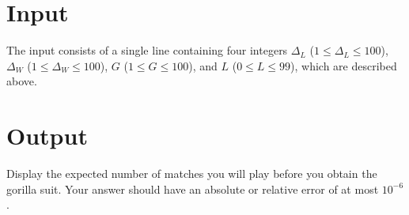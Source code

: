 
\section*{Input}
The input consists of a single line containing four integers $\Delta_L$ ($1 \leq \Delta_L \leq 100$),
$\Delta_W$ ($1 \leq \Delta_W \leq 100$), $G$ ($1 \leq G \leq 100$), and $L$ ($0 \leq L \leq 99$),
which are described above.

\section*{Output}
Display the expected number of matches you will play before you obtain the gorilla suit.
Your answer should have an absolute or relative error of at most $10^{-6}$.
